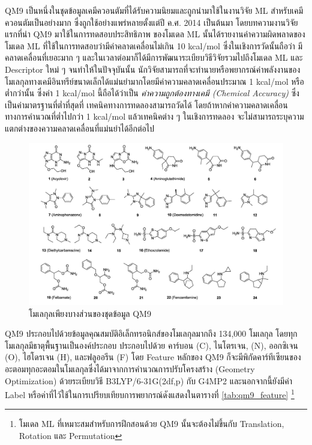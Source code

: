 QM9 เป็นหนึ่งในชุดข้อมูลเคมีควอนตัมที่ได้รับความนิยมและถูกนำมาใช้ในงานวิจัย ML สำหรับเคมีควอนตัมเป็นอย่างมาก ซึ่งถูกใช้อย่างแพร่หลายตั้งแต่ปี 
ค.ศ. 2014 เป็นต้นมา\autocite{ruddigkeit2012,ramakrishnan2014} โดยบทความงานวิจัยแรกที่นำ QM9 มาใช้ในการทดสอบประสิทธิภาพ%
ของโมเดล ML นั้นได้รายงานค่าความผิดพลาดของโมเดล ML ที่ใช้ในการทดสอบว่ามีค่าคลาดเคลื่อนไม่เกิน 10 kcal/mol ซึ่งในเชิงการวัดนั้นถือว่า%
มีคลาดเคลื่อนที่เยอะมาก ๆ และในเวลาต่อมาก็ได้มีการพัฒนาระเบียบวิธีวิจัยรวมไปถึงโมเดล ML และ Descriptor ใหม่ ๆ จนทำให้ในปัจจุบันนั้น%
นักวิจัยสามารถที่จะทำนายหรือพยากรณ์ค่าพลังงานของโมเลกุลทางเคมีอินทรีย์ขนาดเล็กได้แม่นยำมากโดยมีค่าความคลาดเคลื่อนประมาณ 1 kcal/mol 
หรือต่ำกว่านั้น ซึ่งค่า 1 kcal/mol นี้ถือได้ว่าเป็น \textit{ค่าความถูกต้องทางเคมี (Chemical Accuracy)} ซึ่งเป็นค่ามาตรฐานที่ต่ำที่สุดที่%
เทคนิคทางการทดลองสามารถวัดได้ โดยถ้าหากค่าความคลาดเคลื่อนทางการคำนวณที่ต่ำไปกว่า 1 kcal/mol แล้วเทคนิคต่าง ๆ ในเชิงการทดลอง%
จะไม่สามารถระบุความแตกต่างของความคลาดเคลื่อนที่แม่นยำได้อีกต่อไป

\begin{figure}[htbp]
    \centering
    \includegraphics[width=\linewidth]{fig/qm9_molecules.jpg}
    \caption{โมเลกุลเพียงบางส่วนของชุดข้อมูล QM9}
    \label{fig:m9_mol}
\end{figure}

QM9 ประกอบไปด้วยข้อมูลคุณสมบัติอิเล็กทรอนิกส์ของโมเลกุลมากถึง 134,000 โมเลกุล โดยทุกโมเลกุลมีธาตุพื้นฐานเป็นองค์ประกอบ ประกอบไปด้วย 
คาร์บอน (C), ไนโตรเจน, (N), ออกซิเจน (O), ไฮโดรเจน (H), และฟลูออรีน (F) โดย Feature หลักของ QM9 ก็จะมีพิกัดคาร์ทีเซียนของ%
อะตอมทุกอะตอมในโมเลกุลซึ่งได้มาจากการคำนวณการปรับโครงสร้าง (Geometry Optimization) ด้วยระเบียบวิธี B3LYP/6-31G(2df,p) กับ 
G4MP2 และนอกจากนี้ยังมีค่า Label หรือค่าที่ไว้ใช้ในการเปรียบเทียบการพยากรณ์ดังแสดงในตารางที่ \ref{tab:qm9_feature}%
\footnote{โมเดล ML ที่เหมาะสมสำหรับการฝึกสอนด้วย QM9 นั้นจะต้องไม่ขึ้นกับ Translation, Rotation และ Permutation}

